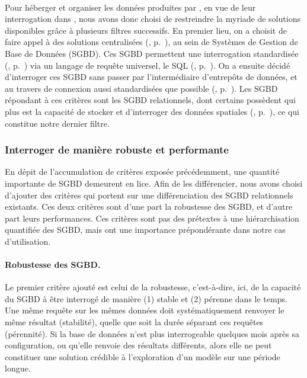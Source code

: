 \paragraph[Conclusion intermédiaire]{}

Pour héberger et organiser les données produites par \simfeodal{}, en vue de leur interrogation dans \simedb{}, nous avons donc choisi de restreindre la myriade de solutions disponibles grâce à plusieurs filtres successifs.
En premier lieu, on a choisit de faire appel à des solutions centralisées (, p.~\pageref{par:stockage-centralise}), au sein de Systèmes de Gestion de Base de Données (SGBD).
Ces SGBD permettent une interrogation standardisée (, p.~\pageref{par:interrogation-generique}) via un langage de requête universel, le SQL (, p.~\pageref{par:sql-nosql}).
On a ensuite décidé d'interroger ces SGBD sans passer par l'intermédiaire d'entrepôts de données, et au travers de connexion aussi standardisées que possible (, p.~\pageref{par:interrogation-directe}).
Les SGBD répondant à ces critères sont les SGBD relationnels, dont certains possèdent qui plus est la capacité de stocker et d'interroger des données spatiales (, p.~\pageref{par:sgbd-spatial}), ce qui constitue notre dernier filtre.

\subsubsection{Interroger de manière robuste et performante}\label{subsubsec:interroger-robuste-efficace}

En dépit de l'accumulation de critères exposée précédemment, une quantité importante de SGBD demeurent en lice.
Afin de les différencier, nous avons choisi d'ajouter des critères qui portent sur une différenciation des SGBD relationnels existants.
Ces deux critères sont d'une part la robustesse des SGBD, et d'autre part leurs performances.
Ces critères sont pas des \og prétextes \fg{} à une hiérarchisation quantifiée des SGBD, mais ont une importance prépondérante dans notre cas d'utilisation.

\paragraph{Robustesse des SGBD.}
Le premier critère ajouté est celui de la robustesse, c'est-à-dire, ici, de la capacité du SGBD à être interrogé de manière (1) stable et (2) pérenne dans le temps.
Une même requête sur les mêmes données doit systématiquement renvoyer le même résultat (stabilité), quelle que soit la durée séparant ces requêtes (pérennité).
Si la base de données n'est plus interrogeable quelques mois après sa configuration, ou qu'elle renvoie des résultats différents, alors elle ne peut constituer une solution crédible à l'exploration d'un modèle sur une période longue.

